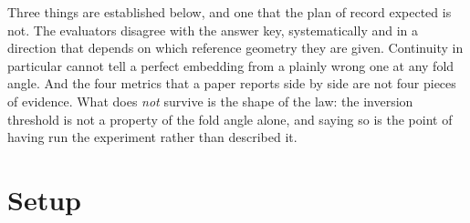 \documentclass[
  british,
  a4paper,
]{book}
\begin{document}
Three things are established below, and one that the plan of record expected is
not. The evaluators disagree with the answer key, systematically and in a
direction that depends on which reference geometry they are given. Continuity
in particular cannot tell a perfect embedding from a plainly wrong one at any
fold angle. And the four metrics that a paper reports side by side are not four
pieces of evidence. What does \emph{not} survive is the shape of the law: the
inversion threshold is not a property of the fold angle alone, and saying so is
the point of having run the experiment rather than described it.

\section{Setup}\label{eval-setup}
\end{document}
